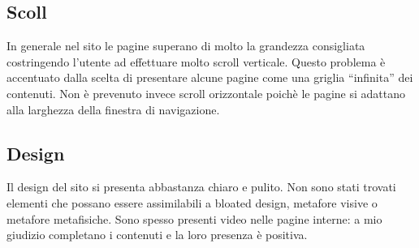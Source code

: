 \documentclass[../ProgettoTecWeb2.tex]{subfiles}
\begin{document}
	\subsection{Scoll}
	In generale nel sito le pagine superano di molto la grandezza consigliata costringendo l'utente ad effettuare molto scroll verticale. Questo problema è accentuato dalla scelta di presentare alcune pagine come una griglia ``infinita'' dei contenuti. Non è prevenuto invece scroll orizzontale poichè le pagine si adattano alla larghezza della finestra di navigazione.

	\subsection{Design}
	Il design del sito si presenta abbastanza chiaro e pulito. Non sono stati trovati elementi che possano essere assimilabili a bloated design, metafore visive o metafore metafisiche. Sono spesso presenti video nelle pagine interne: a mio giudizio completano i contenuti e la loro presenza è positiva.
\end{document}
